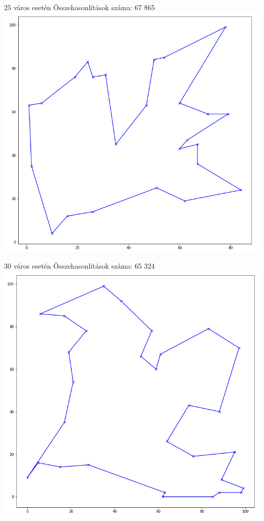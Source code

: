 25 város esetén
Összehasonlítások száma: 67 865
\includegraphics[scale=0.4]{images/25.png}

30 város esetén
Összehasonlítások száma: 65 324
\includegraphics[scale=0.4]{images/30.png}

